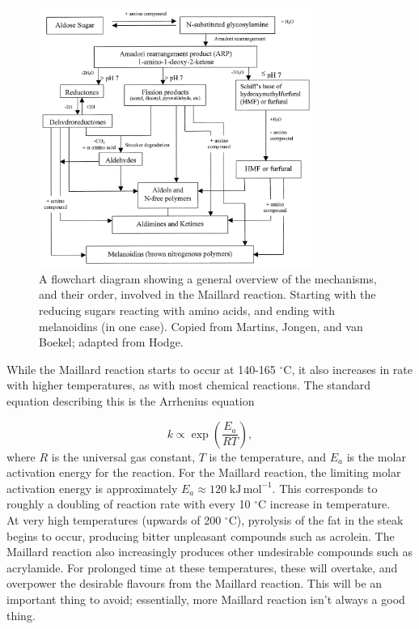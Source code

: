 \documentclass[11pt]{article}
\begin{document}
	\begin{figure}[H]
		\centering
		\includegraphics[width=0.8\textwidth]{./img/maillard-mechanism.png}
		\caption{A flowchart diagram showing a general overview of the mechanisms, and their order, involved in the Maillard reaction. Starting with the reducing sugars reacting with amino acids, and ending with melanoidins (in one case). Copied from Martins, Jongen, and van Boekel\cite{maillard_mechanism}; adapted from Hodge\cite{hodge_adapted}.}
		\label{fig:maillard_mechanism}
	\end{figure}
	
	While the Maillard reaction starts to occur at 140-165 $^\circ \text{C}$, it also increases in rate with higher temperatures, as with most chemical reactions. The standard equation describing this is the Arrhenius equation\cite{arrhenius, arrhenius_2}
	
	\begin{equation}
		k \propto \exp{\left(\frac{E_a}{RT}\right)},
	\end{equation}
	where $R$ is the universal gas constant, $T$ is the temperature, and $E_a$ is the molar activation energy for the reaction. For the Maillard reaction, the limiting molar activation energy is approximately $E_a \approx 120\;\mathrm{kJ}\,\mathrm{mol}^{-1}$\cite{maillard_activation}. This corresponds to roughly a doubling of reaction rate with every 10 $^\circ \text{C}$ increase in temperature. \\
	
	At very high temperatures (upwards of 200 $^\circ \text{C}$), pyrolysis of the fat in the steak begins to occur, producing bitter unpleasant compounds such as acrolein\cite{acrolein}. The Maillard reaction also increasingly produces other undesirable compounds such as acrylamide\cite{acrylamide}. For prolonged time at these temperatures, these will overtake, and overpower the desirable flavours from the Maillard reaction. This will be an important thing to avoid; essentially, more Maillard reaction isn't always a good thing.
	
\end{document}
